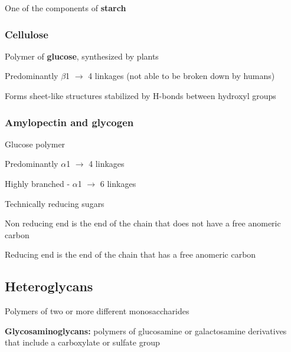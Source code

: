 \documentclass[letterpaper, 12pt]{article}
\begin{document}
One of the components of \textbf{starch}

\subsubsection*{Cellulose}
Polymer of \textbf{glucose}, synthesized by plants

Predominantly $\beta$1 $\to$ 4 linkages (not able to be broken down by humans)

Forms sheet-like structures stabilized by H-bonds between hydroxyl groups

\subsubsection*{Amylopectin and glycogen}
Glucose polymer

Predominantly $\alpha$1 $\to$ 4 linkages

Highly branched - $\alpha$1 $\to$ 6 linkages

Technically reducing sugars

Non reducing end is the end of the chain that does not have a free anomeric carbon

Reducing end is the end of the chain that has a free anomeric carbon

\subsection*{Heteroglycans}
Polymers of two or more different monosaccharides

\textbf{Glycosaminoglycans:} polymers of glucosamine or galactosamine derivatives that include a carboxylate or sulfate group
\end{document}
